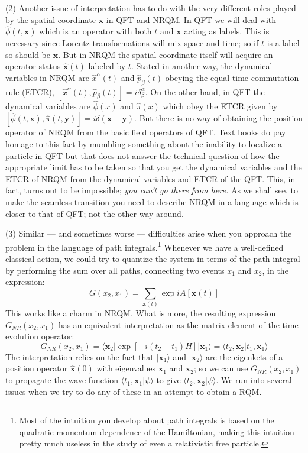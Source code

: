 \documentclass{article}
\def\ket#1{|#1\rangle}                    %
\def\bk#1#2#3{{\langle #1|#2|#3\rangle}}  %
\def\amp#1#2{\langle #1 | #2\rangle}      %
\begin{document}
 (2) Another issue of interpretation has to do with the very different roles played by the spatial coordinate $\bm{x}$ in QFT and NRQM. In QFT we will deal with $\hat \phi (t,\bm{x})$ which is an operator with both $t$ and $\bm{x}$ acting as labels. This is necessary since Lorentz transformations will mix space and time; so if $t$ is a label so should be $\bm{x}$. But in NRQM the spatial coordinate itself will acquire an operator status $\hat{\bm{x}}(t)$ labeled by $t$. Stated in another way, the dynamical variables
 in NRQM
 are $\hat{x}^\alpha(t)$ and $\hat{p}_\beta(t)$ obeying the equal time commutation rule (ETCR), $[\hat{x}^\alpha(t),\hat{p}_\beta(t)]= i \delta^\alpha_\beta$. On the other hand, in QFT the dynamical variables are $\hat{\phi}(x)$ and $\hat{\pi}(x)$ which obey the ETCR given by $[\hat{\phi}(t,\bm{x}), \hat{\pi}(t,\bm{y})] = i\delta (\bm{x-y})$. But there is no way of obtaining the position operator of NRQM from the basic field operators of QFT. Text books do pay homage to this fact by mumbling something about the inability to localize a particle in QFT but that does not answer the technical question of how the appropriate limit has to be taken so that you get the dynamical variables and the ETCR of NRQM from the dynamical variables and ETCR of the QFT. This, in fact, turns out to be impossible; \textit{you can't go there from here.} As we shall see, to make the seamless transition you need to describe  NRQM in a language which is closer to that of QFT; not the other way around.
 
 (3) Similar --- and sometimes worse --- difficulties arise when you approach the problem in the language of path integrals.\footnote{Most of the intuition you develop about path integrals is based on the quadratic momentum dependence of the Hamiltonian, making this intuition pretty much useless in the study of even a relativistic free  particle.} 
 Whenever we have a well-defined classical action,  we could try to  quantize the system in terms of the path integral by performing the sum over all paths, connecting two events $x_1$ and $x_2$, in the expression:
\begin{equation}
 G(x_2,x_1)=\sum_{\bm{x}(t)}\exp iA[\bm{x}(t)]
 \label{gassum}
\end{equation}
This works like a charm in NRQM. What is more, the resulting expression $G_{NR}(x_2,x_1)$  has an equivalent interpretation  as the matrix element of the time evolution operator:
\begin{equation}
 G_{NR}(x_2,x_1)=\bk{\bm{x}_2}{\exp[-i(t_2-t_1)H]}{\bm{x}_1}=\amp{t_2,\bm{x}_2}{t_1,\bm{x}_1}
 \label{gasme}
\end{equation}
The interpretation  relies on the fact that $\ket{\bm{x}_1}$ and $\ket{\bm{x}_2}$ are the eigenkets of a position operator $\hat{\bm{x}}(0)$ with eigenvalues $\bm{x}_1$ and $\bm{x}_2$; so we can use $G_{NR}(x_2,x_1)$ to propagate the wave function $\amp{t_1,\bm{x}_1}{\psi}$ to give
$\amp{t_2,\bm{x}_2}{\psi}$. We run into several issues when we try to do any of these in an attempt to obtain a RQM.
\end{document}
